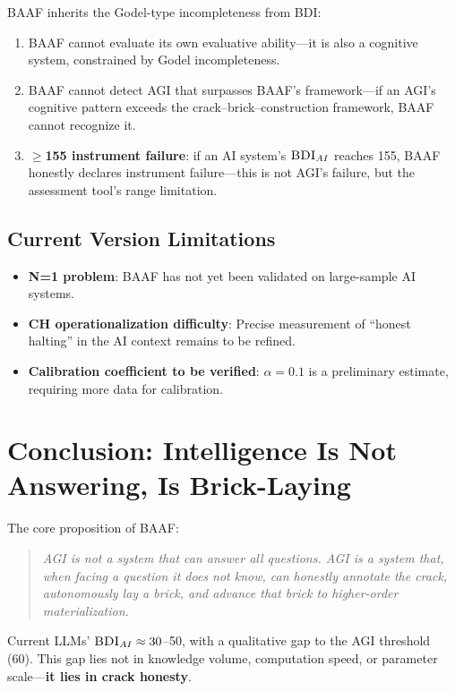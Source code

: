 \documentclass[11pt,a4paper]{article}
\theoremstyle{definition}
\theoremstyle{plain}
\newcommand{\BDI}{\textsc{BDI}}
\newcommand{\BAAF}{\textsc{BAAF}}
\begin{document}
\BAAF{} inherits the Godel-type incompleteness from \BDI{}:
\begin{enumerate}
    \item \BAAF{} cannot evaluate its own evaluative ability---it is also a cognitive system, constrained by Godel incompleteness.
    \item \BAAF{} cannot detect AGI that surpasses \BAAF{}'s framework---if an AGI's cognitive pattern exceeds the crack--brick--construction framework, \BAAF{} cannot recognize it.
    \item \textbf{$\geq$155 instrument failure}: if an AI system's $\BDI_{AI}$ reaches 155, \BAAF{} honestly declares instrument failure---this is not AGI's failure, but the assessment tool's range limitation.
\end{enumerate}

\subsection{Current Version Limitations}

\begin{itemize}
    \item \textbf{N=1 problem}: \BAAF{} has not yet been validated on large-sample AI systems.
    \item \textbf{CH operationalization difficulty}: Precise measurement of ``honest halting'' in the AI context remains to be refined.
    \item \textbf{Calibration coefficient to be verified}: $\alpha = 0.1$ is a preliminary estimate, requiring more data for calibration.
\end{itemize}

\section{Conclusion: Intelligence Is Not Answering, Is Brick-Laying}
\label{sec:conclusion}

The core proposition of \BAAF{}:

\begin{quote}
\textit{AGI is not a system that can answer all questions. AGI is a system that, when facing a question it does not know, can honestly annotate the crack, autonomously lay a brick, and advance that brick to higher-order materialization.}
\end{quote}

Current LLMs' $\BDI_{AI} \approx 30$--50, with a qualitative gap to the AGI threshold (60). This gap lies not in knowledge volume, computation speed, or parameter scale---\textbf{it lies in crack honesty}.
\end{document}
